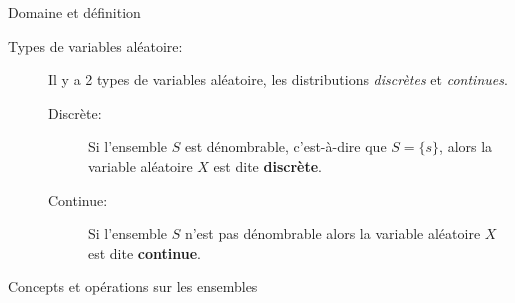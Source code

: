 \documentclass[10pt, french]{article}
\begin{document}
\begin{multicols*}{3}
\begin{rappel}{Domaine et définition}
\begin{description}
	\item[Types de variables aléatoire: ]	Il y a 2 types de variables aléatoire, les distributions \textit{discrètes} et \textit{continues}.
		\begin{description}
		\item[Discrète: ]	Si l'ensemble $S$ est dénombrable, c'est-à-dire que $S= \{s\}$, alors la variable aléatoire $X$ est dite \textbf{discrète}.
		\item[Continue: ]	Si l'ensemble $S$ n'est pas dénombrable alors la variable aléatoire $X$ est dite \textbf{continue}.
	\end{description}
\end{description}
\end{rappel}

\begin{probch2}{Concepts et opérations sur les ensembles}
\begin{description} 



\end{description}
\end{probch2}
\end{multicols*}
\end{document}
